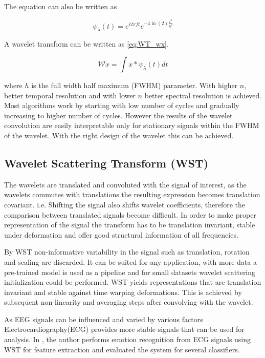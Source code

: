 The equation  can also be written as  

\begin{equation} \label{eq:Mrlt2}
    \psi_\lambda(t) = e^{i2\pi ft} e^{-4\ln(2)\frac{t^2}{h^2}}
\end{equation}

A wavelet transform can be written as \ref{eq:WT_wx}.

\begin{equation} \label{eq:WT_wx}
    \mathcal{W}x  = \int x \ast \psi_\lambda(t) dt
\end{equation}

where $h$ is the full width half maximum (FWHM) parameter. With higher $n$, better temporal resolution and with lower $n$ better spectral resolution is achieved. Most algorithms work by starting with low number of cycles and gradually increasing to higher number of cycles. However the results of the wavelet convolution are easily interpretable only for stationary signals within the FWHM of the wavelet. With the right design of the wavelet this can be achieved.

\subsection{Wavelet Scattering Transform (WST)}
The wavelets are translated and convoluted with the signal of interest, as the wavelets commutes with translations the resulting expression becomes translation covariant. i.e. Shifting the signal also shifts wavelet coefficients, therefore the comparison between translated signals become difficult. In order to make proper representation of the signal the transform has to be translation invariant, stable under deformation and offer good structural information of all frequencies.

By WST non-informative variability in the signal such as translation, rotation and scaling are discarded. It can be suited for any application, with more data a pre-trained model is used as a pipeline and for small datasets wavelet scattering initialization could be performed. WST yields representations that are translation invariant and stable against time warping deformations. This is achieved by subsequent non-linearity and averaging steps after convolving with the wavelet. 

As EEG signals can be influenced and varied by various factors Electrocardiography(ECG) provides more stable signals that can be used for analysis. In \cite{2021_ECG_WST_ML}, the author performs emotion recognition from ECG signals using WST for feature extraction and evaluated the system for several classifiers.

